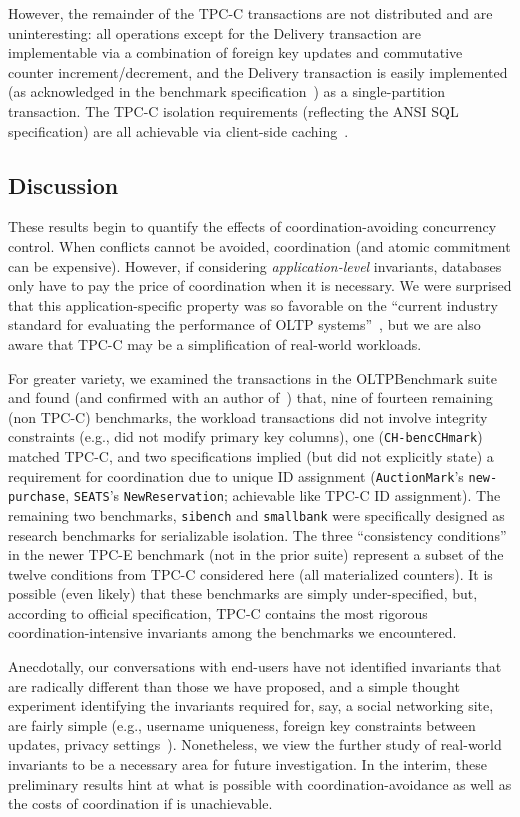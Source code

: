  However, the remainder of the TPC-C
transactions are not distributed and are uninteresting: all operations
except for the Delivery transaction are implementable via a
combination of foreign key updates and commutative counter
increment/decrement, and the Delivery transaction is easily
implemented (as acknowledged in the benchmark
specification~\cite{tpcc}) as a single-partition transaction. The
TPC-C isolation requirements (reflecting the ANSI SQL specification)
are all achievable via client-side caching~\cite{hat-vldb}.

\subsection{Discussion}

These results begin to quantify the effects of coordination-avoiding
concurrency control. When conflicts cannot be avoided, coordination
(and atomic commitment can be expensive). However, if considering
\textit{application-level} invariants, databases only have to pay the
price of coordination when it is necessary. We were surprised that
this application-specific property was so favorable on the ``current
industry standard for evaluating the performance of OLTP
systems''~\cite{oltpbench}, but we are also aware that TPC-C may be a
simplification of real-world workloads.

For greater variety, we examined the transactions in the OLTPBenchmark
suite~\cite{oltpbench} and found (and confirmed with an author
of~\cite{oltpbench}) that, nine of fourteen remaining (non TPC-C)
benchmarks, the workload transactions did not involve integrity
constraints (e.g., did not modify primary key columns), one
(\texttt{CH-bencCHmark}) matched TPC-C, and two specifications implied
(but did not explicitly state) a requirement for coordination due to
unique ID assignment (\texttt{AuctionMark}'s \texttt{new-purchase},
\texttt{SEATS}'s \texttt{NewReservation}; achievable like TPC-C ID
assignment). The remaining two benchmarks, \texttt{sibench} and
\texttt{smallbank} were specifically designed as research benchmarks
for serializable isolation. The three ``consistency conditions'' in
the newer TPC-E benchmark (not in the prior suite) represent a subset
of the twelve conditions from TPC-C considered here (all materialized
counters). It is possible (even likely) that these benchmarks are
simply under-specified, but, according to official specification,
TPC-C contains the most rigorous coordination-intensive invariants
among the benchmarks we encountered.

Anecdotally, our conversations with end-users have not identified
invariants that are radically different than those we have proposed,
and a simple thought experiment identifying the invariants required
for, say, a social networking site, are fairly simple (e.g., username
uniqueness, foreign key constraints between updates, privacy
settings~\cite{pnuts}). Nonetheless, we view the further study of
real-world invariants to be a necessary area for future
investigation. In the interim, these preliminary results hint at what
is possible with coordination-avoidance as well as the costs of
coordination if \cfreedom is unachievable.


